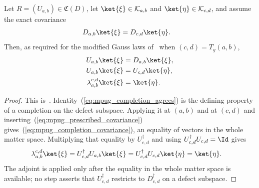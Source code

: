 \begin{lemma}
    \label{thm:mpug_completion_transport}
    \leanok
    Let $R=(U_{a,b})\in\mathfrak C(D)$, let
    $\ket{\xi}\in\mathcal K_{a,b}$ and $\ket{\eta}\in\mathcal K_{c,d}$, and
    assume the exact covariance
    \begin{align}
        D_{a,b}\ket{\xi} & =D_{c,d}\ket{\eta}.
        \label{eq:mpug_prescribed_covariance}
    \end{align}
    Then, as required for the modified Gauss laws
    of~\cite[lines~4325--4335]{FrancoRubio2025MPUGauging} when $(c,d)=T_g(a,b)$,
    \begin{align}
        U_{a,b}\ket{\xi}             & =D_{a,b}\ket{\xi},
        \label{eq:mpug_completion_agrees}                  \\
        U_{a,b}\ket{\xi}             & =U_{c,d}\ket{\eta},
        \label{eq:mpug_completion_covariance}              \\
        \lambda_{a,b}^{c,d}\ket{\xi} & =\ket{\eta}.
        \label{eq:mpug_completion_transport}
    \end{align}
\end{lemma}

\begin{proof}\leanok
    This is~\cite[``Comparison identity for a
        completion'']{QICLean2026Blueprint}.
    Identity~(\ref{eq:mpug_completion_agrees}) is the defining property of a
    completion on the defect subspace. Applying it at $(a,b)$ and at $(c,d)$
    and inserting~(\ref{eq:mpug_prescribed_covariance})
    gives~(\ref{eq:mpug_completion_covariance}), an equality of vectors in the
    whole matter space. Multiplying that equality by $U_{c,d}^\dagger$ and
    using $U_{c,d}^\dagger U_{c,d}=\Id$ gives
    \begin{align}
        \lambda_{a,b}^{c,d}\ket{\xi}
         & =U_{c,d}^\dagger U_{a,b}\ket{\xi}
        =U_{c,d}^\dagger U_{c,d}\ket{\eta}
        =\ket{\eta}.
    \end{align}
    The adjoint is applied only after the equality in the whole matter space
    is available; no step asserts that $U_{c,d}^\dagger$ restricts to
    $D_{c,d}^\dagger$ on a defect subspace.
\end{proof}

